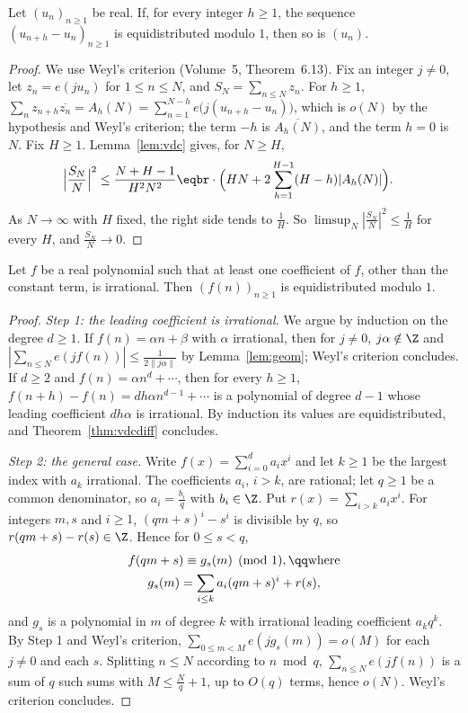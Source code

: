 \begin{theorem}\label{thm:vdcdiff}
Let $(u_n)_{n\ge1}$ be real. If, for every integer $h\ge1$, the sequence $(u_{n+h}-u_n)_{n\ge1}$ is equidistributed modulo $1$, then so is $(u_n)$.
\end{theorem}

\begin{proof}
We use Weyl's criterion (Volume~5, Theorem~6.13). Fix an integer $j\ne0$, let $z_n=e(ju_n)$ for $1\le n\le N$, and $S_N=\sum_{n\le N}z_n$. For $h\ge1$, $\sum_nz_{n+h}\overline{z_n}=A_h(N)=\sum_{n=1}^{N-h}e\bigl(j(u_{n+h}-u_n)\bigr)$, which is
$o(N)$ by the hypothesis and Weyl's criterion; the term $-h$ is $\overline{A_h(N)}$, and the term $h=0$ is $N$. Fix $H\ge1$. Lemma~\ref{lem:vdc} gives, for $N\ge H$,
\[
\begin{aligned}\Bigl|\frac{S_N}N\Bigr|^2&\le\frac{N+H-1}{H^2N^2}\eqbr\cdot\Bigl(HN+2\sum_{h=1}^{H-1}(H-h)|A_h(N)|\Bigr).\end{aligned}
\]
As $N\to\infty$ with $H$ fixed, the right side tends to $\frac1H$. So $\limsup_N|\frac{S_N}N|^2\le\frac1H$ for every $H$, and $\frac{S_N}N\to0$.
\end{proof}

\begin{theorem}[Weyl, 1916]\label{thm:weylpoly}
Let $f$ be a real polynomial such that at least one coefficient of $f$, other than the constant term, is irrational. Then $(f(n))_{n\ge1}$ is equidistributed modulo $1$.
\end{theorem}

\begin{proof}
\emph{Step 1: the leading coefficient is irrational.} We argue by induction on the degree $d\ge1$. If $f(n)=\alpha n+\beta$ with $\alpha$ irrational, then for $j\ne0$, $j\alpha\notin\Z$ and $|\sum_{n\le N}e(jf(n))|\le\frac1{2\|j\alpha\|}$
by Lemma~\ref{lem:geom}; Weyl's criterion concludes. If $d\ge2$ and $f(n)=\alpha n^d+\cdots$, then for every $h\ge1$, $f(n+h)-f(n)=d h\alpha n^{d-1}+\cdots$ is a polynomial of degree $d-1$ whose leading coefficient
$dh\alpha$ is irrational. By induction its values are equidistributed, and Theorem~\ref{thm:vdcdiff} concludes.

\emph{Step 2: the general case.} Write $f(x)=\sum_{i=0}^da_ix^i$ and let $k\ge1$ be the largest index with $a_k$ irrational. The coefficients $a_i$, $i>k$, are rational; let $q\ge1$ be a common denominator, so $a_i=\frac{b_i}q$
with $b_i\in\Z$. Put $r(x)=\sum_{i>k}a_ix^i$. For integers $m,s$ and $i\ge1$, $(qm+s)^i-s^i$ is divisible by $q$, so $r(qm+s)-r(s)\in\Z$. Hence for $0\le s<q$,
\[
\begin{gathered}f(qm+s)\equiv g_s(m)\pmod1,\qq\text{where}\\g_s(m)=\sum_{i\le k}a_i(qm+s)^i+r(s),\end{gathered}
\]
and $g_s$ is a polynomial in $m$ of degree $k$ with irrational leading coefficient $a_kq^k$. By Step 1 and Weyl's criterion, $\sum_{0\le m<M}e(jg_s(m))=o(M)$ for each $j\ne0$ and each $s$. Splitting $n\le N$ according to
$n\bmod q$, $\sum_{n\le N}e(jf(n))$ is a sum of $q$ such sums with $M\le\frac Nq+1$, up to $O(q)$ terms, hence $o(N)$. Weyl's criterion concludes.
\end{proof}

